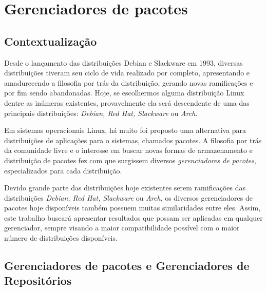 \section{Gerenciadores de pacotes} %
\label{sec:distribui_es_abordadas}

\subsection{Contextualização} %
\label{sec:breve_descri_o}

Desde o lançamento das distribuições Debian e Slackware em 1993, diversas distribuições tiveram seu ciclo de vida realizado por completo, apresentando e amadurecendo a filosofia por trás da distribuição, gerando novas ramificações e por fim sendo abandonadas. Hoje, se escolhermos alguma distribuição Linux dentre as inúmeras existentes, provavelmente ela será descendente de uma das principais distribuições: \textit{Debian, Red Hat, Slackware} ou \textit{Arch}.

Em sistemas operacionais Linux, há muito foi proposto uma alternativa para distribuições de aplicações para o sistemas, chamados pacotes. A filosofia por trás da comunidade livre e o interesse em buscar novas formas de armazenamento e distribuição de pacotes fez com que surgissem diversos \textit{gerenciadores de pacotes}, especializados para cada distribuição.

Devido grande parte das distribuições hoje existentes serem ramificações das distribuições \textit{Debian, Red Hat, Slackware} ou \textit{Arch}, os diversos gerenciadores de pacotes hoje disponíveis também possuem muitas similaridades entre eles.
Assim, este trabalho buscará apresentar resultados que possam ser aplicadas em qualquer gerenciador, sempre visando a maior compatibilidade possível com o maior número de distribuições disponíveis.



\subsection{Gerenciadores de pacotes e Gerenciadores de Repositórios} %
\label{sec:gerenciadores}


